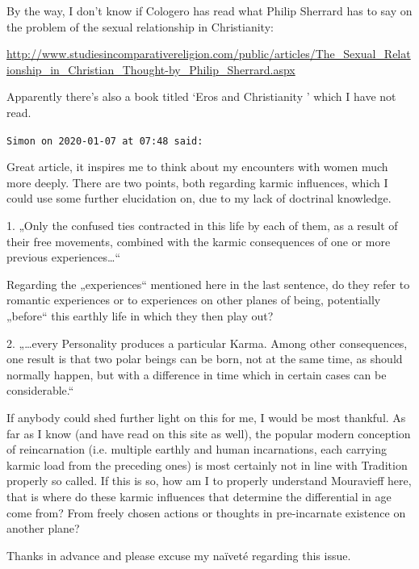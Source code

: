 \begin{footnotesize}
\begin{sffamily}
By the way, I don't know if Cologero has read what Philip Sherrard has to say on the problem of the sexual relationship in Christianity:

\url{http://www.studiesincomparativereligion.com/public/articles/The\_Sexual\_Relationship\_in\_Christian\_Thought-by\_Philip\_Sherrard.aspx}

Apparently there's also a book titled `Eros and Christianity ' which I have not read.


\hfill

\texttt{Simon on 2020-01-07 at 07:48 said: }

Great article, it inspires me to think about my encounters with women much more deeply. There are two points, both regarding karmic influences, which I could use some further elucidation on, due to my lack of doctrinal knowledge.

1. „Only the confused ties contracted in this life by each of them, as a result of their free movements, combined with the karmic consequences of one or more previous experiences…“

Regarding the „experiences“ mentioned here in the last sentence, do they refer to romantic experiences or to experiences on other planes of being, potentially „before“ this earthly life in which they then play out?

2. „…every Personality produces a particular Karma. Among other consequences, one result is that two polar beings can be born, not at the same time, as should normally happen, but with a difference in time which in certain cases can be considerable.“

If anybody could shed further light on this for me, I would be most thankful. As far as I know (and have read on this site as well), the popular modern conception of reincarnation (i.e. multiple earthly and human incarnations, each carrying karmic load from the preceding ones) is most certainly not in line with Tradition properly so called. If this is so, how am I to properly understand Mouravieff here, that is where do these karmic influences that determine the differential in age come from? From freely chosen actions or thoughts in pre-incarnate existence on another plane?

Thanks in advance and please excuse my naïveté regarding this issue.


\end{sffamily}\end{footnotesize}
